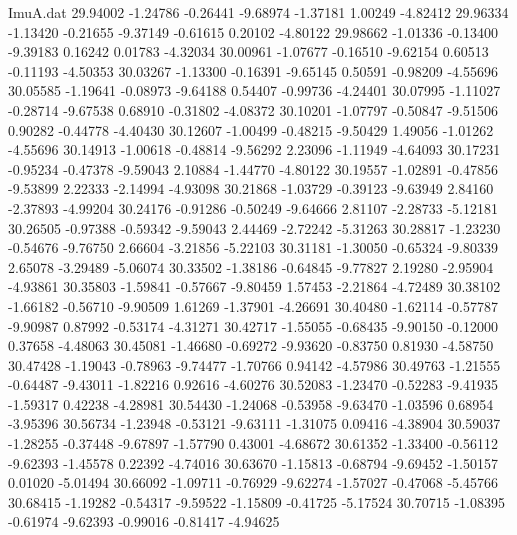 \begin{filecontents}{ImuA.dat}
  29.94002   -1.24786   -0.26441   -9.68974   -1.37181    1.00249   -4.82412
  29.96334   -1.13420   -0.21655   -9.37149   -0.61615    0.20102   -4.80122
  29.98662   -1.01336   -0.13400   -9.39183    0.16242    0.01783   -4.32034
  30.00961   -1.07677   -0.16510   -9.62154    0.60513   -0.11193   -4.50353
  30.03267   -1.13300   -0.16391   -9.65145    0.50591   -0.98209   -4.55696
  30.05585   -1.19641   -0.08973   -9.64188    0.54407   -0.99736   -4.24401
  30.07995   -1.11027   -0.28714   -9.67538    0.68910   -0.31802   -4.08372
  30.10201   -1.07797   -0.50847   -9.51506    0.90282   -0.44778   -4.40430
  30.12607   -1.00499   -0.48215   -9.50429    1.49056   -1.01262   -4.55696
  30.14913   -1.00618   -0.48814   -9.56292    2.23096   -1.11949   -4.64093
  30.17231   -0.95234   -0.47378   -9.59043    2.10884   -1.44770   -4.80122
  30.19557   -1.02891   -0.47856   -9.53899    2.22333   -2.14994   -4.93098
  30.21868   -1.03729   -0.39123   -9.63949    2.84160   -2.37893   -4.99204
  30.24176   -0.91286   -0.50249   -9.64666    2.81107   -2.28733   -5.12181
  30.26505   -0.97388   -0.59342   -9.59043    2.44469   -2.72242   -5.31263
  30.28817   -1.23230   -0.54676   -9.76750    2.66604   -3.21856   -5.22103
  30.31181   -1.30050   -0.65324   -9.80339    2.65078   -3.29489   -5.06074
  30.33502   -1.38186   -0.64845   -9.77827    2.19280   -2.95904   -4.93861
  30.35803   -1.59841   -0.57667   -9.80459    1.57453   -2.21864   -4.72489
  30.38102   -1.66182   -0.56710   -9.90509    1.61269   -1.37901   -4.26691
  30.40480   -1.62114   -0.57787   -9.90987    0.87992   -0.53174   -4.31271
  30.42717   -1.55055   -0.68435   -9.90150   -0.12000    0.37658   -4.48063
  30.45081   -1.46680   -0.69272   -9.93620   -0.83750    0.81930   -4.58750
  30.47428   -1.19043   -0.78963   -9.74477   -1.70766    0.94142   -4.57986
  30.49763   -1.21555   -0.64487   -9.43011   -1.82216    0.92616   -4.60276
  30.52083   -1.23470   -0.52283   -9.41935   -1.59317    0.42238   -4.28981
  30.54430   -1.24068   -0.53958   -9.63470   -1.03596    0.68954   -3.95396
  30.56734   -1.23948   -0.53121   -9.63111   -1.31075    0.09416   -4.38904
  30.59037   -1.28255   -0.37448   -9.67897   -1.57790    0.43001   -4.68672
  30.61352   -1.33400   -0.56112   -9.62393   -1.45578    0.22392   -4.74016
  30.63670   -1.15813   -0.68794   -9.69452   -1.50157    0.01020   -5.01494
  30.66092   -1.09711   -0.76929   -9.62274   -1.57027   -0.47068   -5.45766
  30.68415   -1.19282   -0.54317   -9.59522   -1.15809   -0.41725   -5.17524
  30.70715   -1.08395   -0.61974   -9.62393   -0.99016   -0.81417   -4.94625

\end{filecontents}
